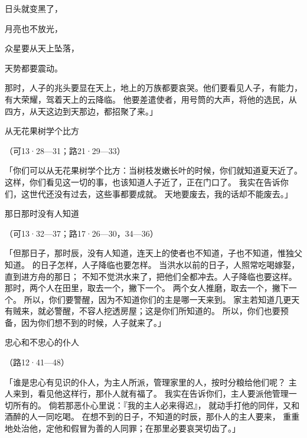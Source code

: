 {\par }{\Q 日头就变黑了，
\par }{\Q 月亮也不放光，
\par }{\Q 众星要从天上坠落，
\par }{\Q 天势都要震动。
\par }{\MM {}那时，人子的兆头要显在天上，地上的万族都要哀哭。他们要看见人子，有能力，有大荣耀，驾着天上的云降临。
他要差遣使者，用号筒的大声，将他的选民，从四方，从天这边到天那边，都招聚了来。」
\par }{\SH 从无花果树学个比方
\par }{\R （可13·28—31；路21·29—33）
\par }{\PP {}「你们可以从无花果树学个比方：当树枝发嫩长叶的时候，你们就知道夏天近了。
这样，你们看见这一切的事，也该知道人子近了，正在门口了。
我实在告诉你们，这世代还没有过去，这些事都要成就。
天地要废去，我的话却不能废去。」
\par }{\SH 那日那时没有人知道
\par }{\R （可13·32—37；路17·26—30，34—36）
\par }{\PP {}「但那日子，那时辰，没有人知道，连天上的使者也不知道，子也不知道，惟独父知道。
的日子怎样，人子降临也要怎样。
当洪水以前的日子，人照常吃喝嫁娶，直到{}进方舟的那日；
不知不觉洪水来了，把他们全都冲去。人子降临也要这样。
那时，两个人在田里，取去一个，撇下一个。
两个女人推磨，取去一个，撇下一个。
所以，你们要警醒，因为不知道你们的主是哪一天来到。
家主若知道几更天有贼来，就必警醒，不容人挖透房屋；这是你们所知道的。
所以，你们也要预备，因为你们想不到的时候，人子就来了。」
\par }{\SH 忠心和不忠心的仆人
\par }{\R （路12·41—48）
\par }{\PP {}「谁是忠心有见识的仆人，为主人所派，管理家里的人，按时分粮给他们呢？
主人来到，看见他这样行，那仆人就有福了。
我实在告诉你们，主人要派他管理一切所有的。
倘若那恶仆心里说：『我的主人必来得迟』，
就动手打他的同伴，又和酒醉的人一同吃喝。
在想不到的日子，不知道的时辰，那仆人的主人要来，
重重地处治他，定他和假冒为善的人同罪；在那里必要哀哭切齿了。」

}
